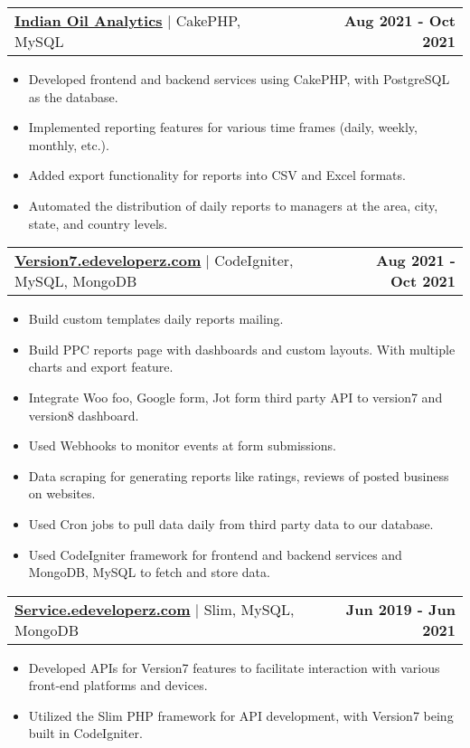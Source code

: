 \documentclass[letterpaper,11pt]{article}
\makeatletter
\newcommand{\resumeItem}[1]{
  \item\small{
    {#1 \vspace{-2pt}}
  }
}
\newcommand{\resumeProjectHeading}[2]{
    \item
    \begin{tabular*}{1.001\textwidth}{l@{\extracolsep{\fill}}r}
      \small#1 & \textbf{\small #2}\\
    \end{tabular*}\vspace{-7pt}
}
\newcommand{\resumeItemListStart}{\begin{itemize}}
\newcommand{\resumeItemListEnd}{\end{itemize}\vspace{-5pt}}
\makeatother
\begin{document}
      \resumeProjectHeading
          {\href{https://ioclanalytics.net/wsp}{\textbf{\large{\underline{Indian Oil Analytics}}}\href{https://ioclanalytics.net/wsp}{\raisebox{-0.1\height}\faExternalLink }} $|$ \large{CakePHP, MySQL}}{Aug 2021 - Oct 2021}
          \resumeItemListStart
            \resumeItem{\normalsize{Developed frontend and backend services using CakePHP, with PostgreSQL as the database.}}
            \resumeItem{\normalsize{Implemented reporting features for various time frames (daily, weekly, monthly, etc.).}}
            \resumeItem{\normalsize{Added export functionality for reports into CSV and Excel formats.}}
            \resumeItem{\normalsize{Automated the distribution of daily reports to managers at the area, city, state, and country levels.}}
          \resumeItemListEnd
          \vspace{-13pt}


      \resumeProjectHeading
          {\href{Version7.edeveloperz.com}{\textbf{\large{\underline{Version7.edeveloperz.com}}}\href{Version7.edeveloperz.com}{\raisebox{-0.1\height}\faExternalLink }} $|$ \large{CodeIgniter, MySQL, MongoDB}}{Aug 2021 - Oct 2021}
          \resumeItemListStart
            \resumeItem{\normalsize{Build custom templates daily reports mailing.}}
            \resumeItem{\normalsize{Build PPC reports page with dashboards and custom layouts. With multiple charts and export feature.}}
            \resumeItem{\normalsize{Integrate Woo foo, Google form, Jot form third party API to version7 and version8 dashboard.}}
            \resumeItem{\normalsize{Used Webhooks to monitor events at form submissions.}}
            \resumeItem{\normalsize{Data scraping for generating reports like ratings, reviews of posted business on websites.}}
            \resumeItem{\normalsize{Used Cron jobs to pull data daily from third party data to our database.}}
            \resumeItem{\normalsize{Used CodeIgniter framework for frontend and backend services and MongoDB, MySQL to fetch and store data.}}
          \resumeItemListEnd
          \vspace{-13pt}

      \resumeProjectHeading
          {{\textbf{\large{\underline{Service.edeveloperz.com}}} {\raisebox{-0.1\height}\faExternalLink }} $|$ \large{Slim, MySQL, MongoDB}}{Jun 2019 - Jun 2021}
          \resumeItemListStart
            \resumeItem{\normalsize{Developed APIs for Version7 features to facilitate interaction with various front-end platforms and devices.}}
            \resumeItem{\normalsize{Utilized the Slim PHP framework for API development, with Version7 being built in CodeIgniter.}}
          \resumeItemListEnd
          \vspace{-13pt}
\end{document}
